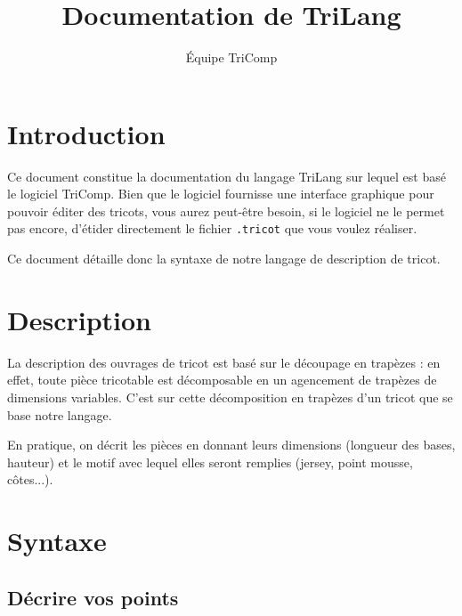\documentclass[a4paper,10pt]{article}
\title{Documentation de TriLang}
\author{Équipe TriComp}
\date{}
\begin{document}
\maketitle

\newpage

\tableofcontents

\newpage

\section{Introduction}

Ce document constitue la documentation du langage TriLang sur lequel est basé le logiciel TriComp.
Bien que le logiciel fournisse une interface graphique pour pouvoir éditer des tricots, vous aurez peut-être 
besoin, si le logiciel ne le permet pas encore, d'étider directement le fichier \texttt{.tricot} que vous voulez 
réaliser. 

Ce document détaille donc la syntaxe de notre langage de description de tricot.

\section{Description}

La description des ouvrages de tricot est basé sur le découpage en trapèzes : en effet, toute pièce tricotable est 
décomposable en un agencement de trapèzes de dimensions variables. C'est sur cette décomposition en trapèzes d'un tricot 
que se base notre langage.

En pratique, on décrit les pièces en donnant leurs dimensions (longueur des bases, hauteur) et le motif avec lequel elles 
seront remplies (jersey, point mousse, côtes...).

\section{Syntaxe}

\subsection{Décrire vos points}

\end{document}
